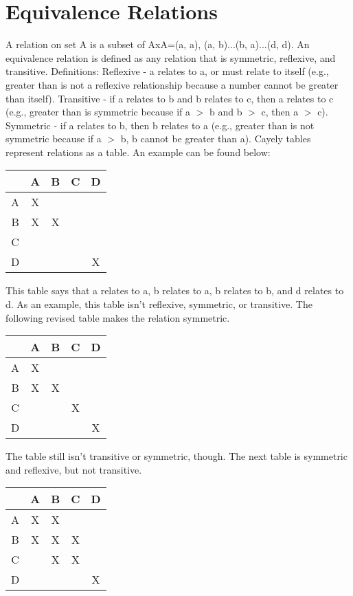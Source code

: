 \documentclass[11pt,twosided]{article}
\begin{document}
\section{Equivalence Relations}
A relation on set A is a subset of AxA={(a, a), (a, b)...(b, a)...(d, d)}. An equivalence relation is defined as any relation that is symmetric, reflexive, and transitive. 
\newline
Definitions:
\newline
Reflexive - a relates to a, or must relate to itself (e.g., greater than is not a reflexive relationship because a number cannot be greater than itself).
\newline
Transitive - if a relates to b and b relates to c, then a relates to c (e.g., greater than is symmetric because if a \(>\) b and b \(>\) c, then a \(>\) c).
\newline
Symmetric - if a relates to b, then b relates to a (e.g., greater than is not symmetric because if a \(>\) b, b cannot be greater than a).
\newline
Cayely tables represent relations as a table. An example can be found below:
\begin{center}
\begin{tabular} {c|c c c c}
& A & B & C & D \\
\hline
A & X &  &  &  \\
B & X & X &  &  \\
C &  &  &  &  \\
D &  &  &  & X \\
\end{tabular}
\end{center}
This table says that a relates to a, b relates to a, b relates to b, and d relates to d. As an example, this table isn't reflexive, symmetric, or transitive.
The following revised table makes the relation symmetric.
\begin{center}
\begin{tabular} {c|c c c c}
& A & B & C & D \\
\hline
A & X &  &  &  \\
B & X & X &  &  \\
C &  &  & X &  \\
D &  &  &  & X \\
\end{tabular}
\end{center}
The table still isn't transitive or symmetric, though. The next table is symmetric and reflexive, but not transitive.
\begin{center}
\begin{tabular} {c|c c c c}
& A & B & C & D \\
\hline
A & X & X &  &  \\
B & X & X & X &  \\
C &  & X & X &  \\
D &  &  &  & X \\
\end{tabular}
\end{center}
\end{document}
